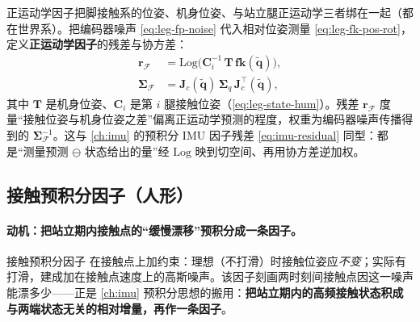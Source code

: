 正运动学因子把脚接触系的位姿、机身位姿、与站立腿正运动学三者绑在一起（都在世界系）。把编码器噪声 \cref{eq:leg-fp-noise} 代入相对位姿测量 \cref{eq:leg-fk-pos-rot}，定义\textbf{正运动学因子}的残差与协方差：
\begin{align}
  \mathbf{r}_{\mathcal{F}}&=\mathrm{Log}\!\big(\mathbf{C}_i^{-1}\,\mathbf{T}\,\mathbf{fk}(\tilde{\mathbf{q}})\big),\label{eq:leg-fk-residual}\\
  \boldsymbol{\Sigma}_{\mathcal{F}}&=\mathbf{J}_c(\tilde{\mathbf{q}})\,\boldsymbol{\Sigma}_q\,\mathbf{J}_c^\top(\tilde{\mathbf{q}}),\label{eq:leg-fk-cov}
\end{align}
其中 $\mathbf{T}$ 是机身位姿、$\mathbf{C}_i$ 是第 $i$ 腿接触位姿（\cref{eq:leg-state-hum}）。残差 $\mathbf{r}_{\mathcal{F}}$ 度量“接触位姿与机身位姿之差”偏离正运动学预测的程度，权重为编码器噪声传播得到的 $\boldsymbol{\Sigma}_{\mathcal{F}}^{-1}$。这与 \cref{ch:imu} 的预积分 IMU 因子残差 \cref{eq:imu-residual} 同型：都是“测量预测 $\ominus$ 状态给出的量”经 $\mathrm{Log}$ 映到切空间、再用协方差逆加权。

\subsection{接触预积分因子（人形）}
\label{subsec:leg-contact-preint}

\paragraph{动机：把站立期内接触点的“缓慢漂移”预积分成一条因子。}
接触预积分因子\cite{hartley2018legged} 在接触点上加约束：理想（不打滑）时接触位姿应\emph{不变}；实际有打滑，建成加在接触点速度上的高斯噪声。该因子刻画两时刻间接触点因这一噪声能漂多少——正是 \cref{ch:imu} 预积分思想的搬用：\textbf{把站立期内的高频接触状态积成与两端状态无关的相对增量，再作一条因子}。

